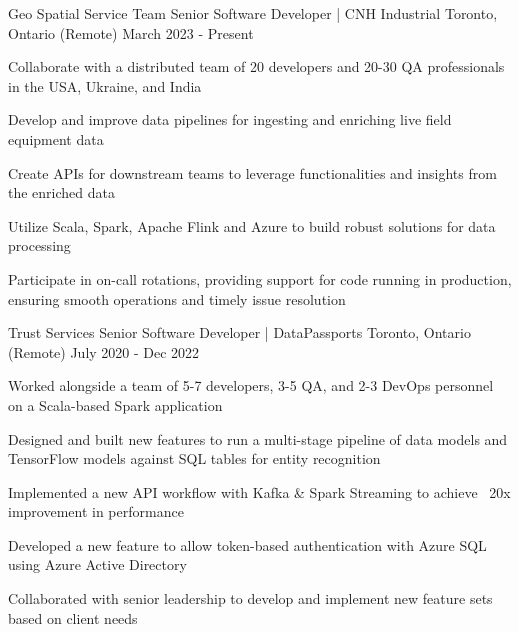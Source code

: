 \begin{cventries}

\cventry
    {Geo Spatial Service Team}
    {Senior Software Developer | CNH Industrial}
    {Toronto, Ontario (Remote)}
    {March 2023 - Present}
    {
      \begin{cvitems}
         \item {Collaborate with a distributed team of 20 developers and 20-30 QA professionals in the USA, Ukraine, and India}
         \item {Develop and improve data pipelines for ingesting and enriching live field equipment data}
         \item {Create APIs for downstream teams to leverage functionalities and insights from the enriched data}
         \item {Utilize Scala, Spark, Apache Flink and Azure to build robust solutions for data processing}
         \item {Participate in on-call rotations, providing support for code running in production, ensuring smooth operations and timely issue resolution}
      \end{cvitems}
    }

\cventry
    {Trust Services}
    {Senior Software Developer | DataPassports}
    {Toronto, Ontario (Remote)}
    {July 2020 - Dec 2022}
    {
      \begin{cvitems}
        \item {Worked alongside a team of 5-7 developers, 3-5 QA, and 2-3 DevOps personnel on a Scala-based Spark application}
        \item {Designed and built new features to run a multi-stage pipeline of data models and TensorFlow models against SQL tables for entity recognition}
        \item {Implemented a new API workflow with Kafka \& Spark Streaming to achieve ~20x improvement in performance}
        \item {Developed a new feature to allow token-based authentication with Azure SQL using Azure Active Directory}
        \item {Collaborated with senior leadership to develop and implement new feature sets based on client needs}
      \end{cvitems}
    }


\end{cventries}

